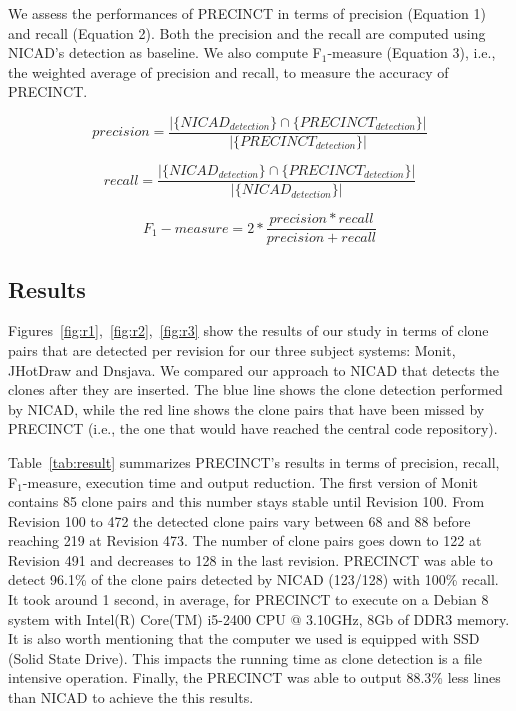 \documentclass[conference]{IEEEtran}
\begin{document}

We assess the performances of PRECINCT in terms of precision (Equation 1) and recall (Equation 2).
Both the precision and the recall are computed using NICAD's detection as baseline.
We also compute F$_{1}$-measure (Equation 3), i.e., the weighted average of precision and recall, to measure the accuracy of PRECINCT.

\begin{equation}
precision = \frac{|\{ NICAD_{detection} \} \cap \{ PRECINCT_{detection} \} |}{| \{ PRECINCT_{detection} \}|}
\end{equation}

\begin{equation}
recall = \frac{|\{ NICAD_{detection} \} \cap \{ PRECINCT_{detection} \} |}{| \{ NICAD_{detection} \}|}
\end{equation}

\begin{equation}
F_1-measure = 2 * \frac{precision * recall}{precision + recall}
\end{equation}




\subsection{Results}
\label{sub:Results}

Figures~\ref{fig:r1},~\ref{fig:r2},~\ref{fig:r3} show the results of our study in terms of clone pairs that are detected per revision for our three subject systems: Monit, JHotDraw and Dnsjava. We compared our approach to NICAD that detects the clones after they are inserted. The blue line shows the clone detection performed by NICAD, while the red line shows the clone pairs that have been missed by PRECINCT (i.e., the one that would have reached the central code repository).



Table~\ref{tab:result} summarizes PRECINCT's results in terms of precision, recall, F$_{1}$-measure, execution time and output reduction.
The first version of Monit contains 85 clone pairs and this number stays stable until Revision 100. From Revision 100 to 472 the detected clone pairs vary between 68 and 88 before reaching 219 at Revision 473.
The number of clone pairs goes down to 122 at Revision 491 and decreases to 128 in the last revision. PRECINCT was able to detect 96.1\% of the clone pairs detected by NICAD (123/128) with 100\% recall.
It took around 1 second, in average, for PRECINCT to execute on a Debian 8 system with Intel(R) Core(TM) i5-2400 CPU @ 3.10GHz, 8Gb of DDR3 memory.
It is also worth mentioning that the computer we used is equipped with SSD (Solid State Drive).
This impacts the running time as clone detection is a file intensive operation.
Finally, the PRECINCT was able to output 88.3\% less lines than NICAD to achieve the this results.
\end{document}
